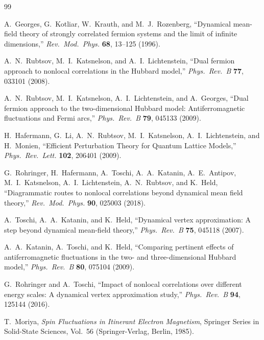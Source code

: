 \documentclass[11pt,a4paper]{article}
\numberwithin{equation}{section}
\theoremstyle{plain}
\theoremstyle{definition}
\begin{document}
\begin{thebibliography}{99}

A.~Georges, G.~Kotliar, W.~Krauth, and M.~J.~Rozenberg,
``Dynamical mean-field theory of strongly correlated fermion systems and the limit of infinite dimensions,''
\textit{Rev.\ Mod.\ Phys.} \textbf{68}, 13--125 (1996).

A.~N.~Rubtsov, M.~I.~Katsnelson, and A.~I.~Lichtenstein,
``Dual fermion approach to nonlocal correlations in the Hubbard model,''
\textit{Phys.\ Rev.\ B} \textbf{77}, 033101 (2008).

A.~N.~Rubtsov, M.~I.~Katsnelson, A.~I.~Lichtenstein, and A.~Georges,
``Dual fermion approach to the two-dimensional Hubbard model: Antiferromagnetic fluctuations and Fermi arcs,''
\textit{Phys.\ Rev.\ B} \textbf{79}, 045133 (2009).

H.~Hafermann, G.~Li, A.~N.~Rubtsov, M.~I.~Katsnelson, A.~I.~Lichtenstein, and H.~Monien,
``Efficient Perturbation Theory for Quantum Lattice Models,''
\textit{Phys.\ Rev.\ Lett.} \textbf{102}, 206401 (2009).

G.~Rohringer, H.~Hafermann, A.~Toschi, A.~A.~Katanin, A.~E.~Antipov, M.~I.~Katsnelson, A.~I.~Lichtenstein, A.~N.~Rubtsov, and K.~Held,
``Diagrammatic routes to nonlocal correlations beyond dynamical mean field theory,''
\textit{Rev.\ Mod.\ Phys.} \textbf{90}, 025003 (2018).

A.~Toschi, A.~A.~Katanin, and K.~Held,
``Dynamical vertex approximation: A step beyond dynamical mean-field theory,''
\textit{Phys.\ Rev.\ B} \textbf{75}, 045118 (2007).

A.~A.~Katanin, A.~Toschi, and K.~Held,
``Comparing pertinent effects of antiferromagnetic fluctuations in the two- and three-dimensional Hubbard model,''
\textit{Phys.\ Rev.\ B} \textbf{80}, 075104 (2009).

G.~Rohringer and A.~Toschi,
``Impact of nonlocal correlations over different energy scales: A dynamical vertex approximation study,''
\textit{Phys.\ Rev.\ B} \textbf{94}, 125144 (2016).

T.~Moriya,
\textit{Spin Fluctuations in Itinerant Electron Magnetism},
Springer Series in Solid-State Sciences, Vol.~56 (Springer-Verlag, Berlin, 1985).


\end{thebibliography}
\end{document}
